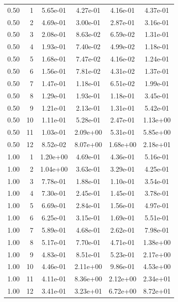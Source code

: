 \begin{longtable}{S[table-format=1.2] r S[table-format=1.2e-2] S[table-format=1.2e-2] S[table-format=1.2e-2] S[table-format=1.2e-2]}
0.50 & 1 & 5.65e-01 & 4.27e-01 & 4.16e-01 & 4.37e-01 \\
0.50 & 2 & 4.69e-01 & 3.00e-01 & 2.87e-01 & 3.16e-01 \\
0.50 & 3 & 2.08e-01 & 8.63e-02 & 6.59e-02 & 1.31e-01 \\
0.50 & 4 & 1.93e-01 & 7.40e-02 & 4.99e-02 & 1.18e-01 \\
0.50 & 5 & 1.68e-01 & 7.47e-02 & 4.16e-02 & 1.24e-01 \\
0.50 & 6 & 1.56e-01 & 7.81e-02 & 4.31e-02 & 1.37e-01 \\
0.50 & 7 & 1.47e-01 & 1.18e-01 & 6.51e-02 & 1.99e-01 \\
0.50 & 8 & 1.29e-01 & 1.93e-01 & 1.18e-01 & 3.45e-01 \\
0.50 & 9 & 1.21e-01 & 2.13e-01 & 1.31e-01 & 5.42e-01 \\
0.50 & 10 & 1.11e-01 & 5.28e-01 & 2.47e-01 & 1.13e+00 \\
0.50 & 11 & 1.03e-01 & 2.09e+00 & 5.31e-01 & 5.85e+00 \\
0.50 & 12 & 8.52e-02 & 8.07e+00 & 1.68e+00 & 2.18e+01 \\
1.00 & 1 & 1.20e+00 & 4.69e-01 & 4.36e-01 & 5.16e-01 \\
1.00 & 2 & 1.04e+00 & 3.63e-01 & 3.29e-01 & 4.25e-01 \\
1.00 & 3 & 7.78e-01 & 1.88e-01 & 1.10e-01 & 3.54e-01 \\
1.00 & 4 & 7.30e-01 & 2.45e-01 & 1.45e-01 & 3.78e-01 \\
1.00 & 5 & 6.69e-01 & 2.84e-01 & 1.56e-01 & 4.97e-01 \\
1.00 & 6 & 6.25e-01 & 3.15e-01 & 1.69e-01 & 5.51e-01 \\
1.00 & 7 & 5.89e-01 & 4.68e-01 & 2.62e-01 & 7.98e-01 \\
1.00 & 8 & 5.17e-01 & 7.70e-01 & 4.71e-01 & 1.38e+00 \\
1.00 & 9 & 4.83e-01 & 8.51e-01 & 5.23e-01 & 2.17e+00 \\
1.00 & 10 & 4.46e-01 & 2.11e+00 & 9.86e-01 & 4.53e+00 \\
1.00 & 11 & 4.11e-01 & 8.36e+00 & 2.12e+00 & 2.34e+01 \\
1.00 & 12 & 3.41e-01 & 3.23e+01 & 6.72e+00 & 8.72e+01 \\
\end{longtable}
